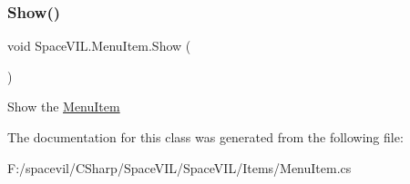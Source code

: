 \subsubsection{\texorpdfstring{Show()}{Show()}}
{\footnotesize\ttfamily void Space\+V\+I\+L.\+Menu\+Item.\+Show (\begin{DoxyParamCaption}{ }\end{DoxyParamCaption})\hspace{0.3cm}{\ttfamily [inline]}}



Show the \mbox{\hyperlink{class_space_v_i_l_1_1_menu_item}{Menu\+Item}} 



The documentation for this class was generated from the following file\+:\begin{DoxyCompactItemize}
\item 
F\+:/spacevil/\+C\+Sharp/\+Space\+V\+I\+L/\+Space\+V\+I\+L/\+Items/Menu\+Item.\+cs\end{DoxyCompactItemize}
